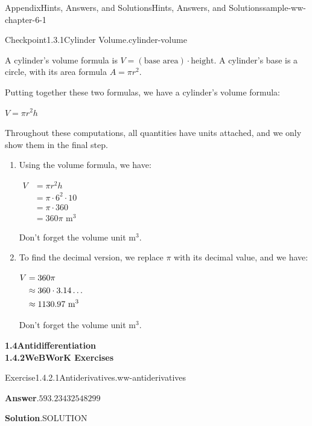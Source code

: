 \documentclass[oneside,10pt,]{book}
\newcommand{\blocktitlefont}{\relax}
\numberwithin{equation}{section}
\newcommand{\amp}{&}
\begin{document}
\begin{solutions-chapter}{Appendix}{Hints, Answers, and Solutions}{}{Hints, Answers, and Solutions}{}{}{sample-ww-chapter-6-1}
\begin{inlinesolution}{Checkpoint}{1.3.1}{Cylinder Volume.}{cylinder-volume}
\par
A cylinder's volume formula is \(V= (\text{base area}) \cdot \text{height}\). A cylinder's base is a circle, with its area formula \(A = \pi r^{2}\).%
\par
Putting together these two formulas, we have a cylinder's volume formula:%
\par
\(\displaystyle{ V= \pi r^{2} h }\)%
\par
Throughout these computations, all quantities have units attached, and we only show them in the final step.%
\par
%
\begin{enumerate}[label={\alph*.}]
\item{}Using the volume formula, we have:%
\par
\(\displaystyle{\begin{aligned}
V \amp  = \pi r^{2} h \\
\amp  = \pi \cdot 6^{2} \cdot 10 \\
\amp  = \pi \cdot 360 \\
\amp  = 360 \pi \textrm{ m}^3
\end{aligned}}\)%
\par
Don't forget the volume unit \(\textrm{m}^3\).%
\item{}To find the decimal version, we replace \(\pi\) with its decimal value, and we have:%
\par
\(\displaystyle{\begin{aligned}[t]
V\amp  = 360 \pi \\
\amp  \approx 360 \cdot 3.14\ldots \\
\amp  \approx {1130.97\ {\rm m^{3}}}
\end{aligned}}\)%
\par
Don't forget the volume unit \(\textrm{m}^3\).%
\end{enumerate}
%
\end{inlinesolution}%
\par\medskip
\noindent\textbf{\Large{}1.4\space\textperiodcentered\space{}Antidifferentiation\\
1.4.2\space\textperiodcentered\space{}WeBWorK Exercises}
\begin{divisionsolution}{Exercise}{1.4.2.1}{Antiderivatives.}{ww-antiderivatives}%
\par\smallskip%
\noindent\textbf{\blocktitlefont Answer}.\hypertarget{ww-antiderivatives-3-back}{}\quad{}\(593.23432548299\)%
\par\smallskip%
\noindent\textbf{\blocktitlefont Solution}.\hypertarget{ww-antiderivatives-4-back}{}\quad{}SOLUTION%

\end{divisionsolution}
\end{solutions-chapter}
\end{document}
